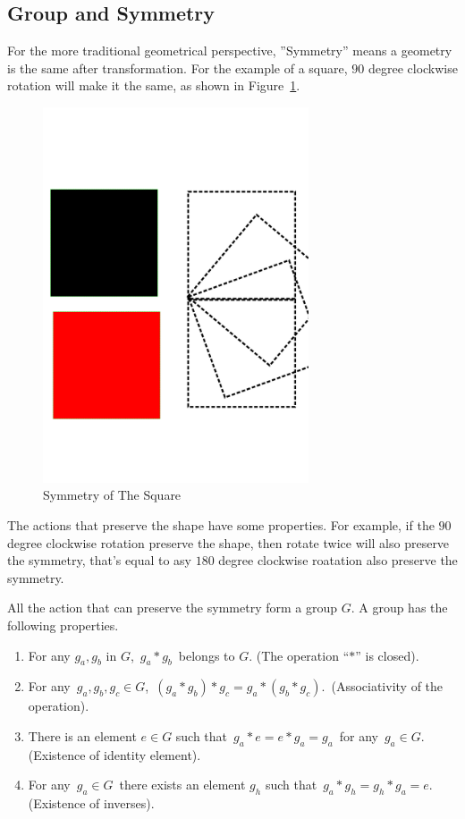 \subsection{Group and Symmetry}
For the more traditional geometrical perspective, ''Symmetry''  means a geometry is the same after transformation.
For the example of a square,  $90$ degree clockwise rotation will make it the same, as shown in Figure~\ref{fig:symsquare}.
\begin{figure}[!htbp]
  	\begin{center}
   	\includegraphics[width=0.7\textwidth]{Symmetry}
	\end{center}
	\caption{Symmetry of The Square}
    \label{fig:symsquare}
\end{figure}

The actions that preserve the shape have some properties.
For example, if the $90$ degree clockwise rotation preserve the shape, then rotate twice will also preserve the symmetry, that's equal to asy $180$ degree clockwise roatation also preserve the symmetry.

All the action that can preserve the symmetry form a group $G$.
A group has the following properties.
\begin{enumerate}
\item For any $g_a,g_b$ in $G$, \,$g_a*g_b$\, belongs to $G$. (The operation ``$*$'' is closed).

\item For any \,$g_a,g_b,g_c\in G$, \,$(g_a*g_b)*g_c=g_a*(g_b*g_c)$. \,(Associativity of the operation).

\item There is an element $e\in G$ such that \,$g_a*e=e*g_a=g_a$\, for any \,$g_a\in G$. (Existence of identity element).

\item For any \,$g_a\in G$\, there exists an element $g_h$ such that \,$g_a*g_h=g_h*g_a=e$. \,(Existence of inverses).
\end{enumerate}

